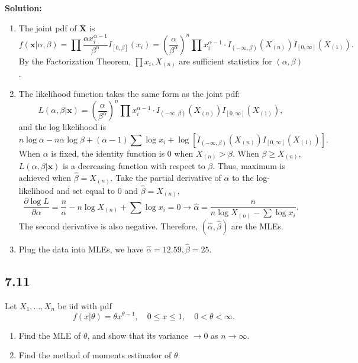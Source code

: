 \documentclass[11pt]{article}
\newcommand{\X}{\mathbf{X}}
\newcommand{\x}{\mathbf{x}}
\newcommand{\Sol}{\par {\bf Solution:}}
\newcommand{\sample}[1]{#1_1 , \dots , #1_n}
\begin{document}
\Sol
\begin{enumerate}[label=(\alph*)]
    \item
    The joint pdf of $\X$ is
    \[
    f(\x|\alpha, \beta) = \prod \frac{\alpha x_i^{\alpha - 1}}{\beta^\alpha} I_{[0,\beta]}(x_i) = (\frac{\alpha}{\beta^\alpha})^n \prod x_i^{\alpha-1} \cdot I_{(-\infty, \beta)}(X_{(n)})I_{[0, \infty]}(X_{(1)}).
    \]
    By the Factorization Theorem, $\prod x_i, X_{(n)}$ are sufficient statistics for $(\alpha , \beta)$.
    
    \item
    The likelihood function takes the same form as the joint pdf:
    \[
    L(\alpha, \beta|\x) = (\frac{\alpha}{\beta^\alpha})^n \prod x_i^{\alpha-1} \cdot I_{(-\infty, \beta)}(X_{(n)})I_{[0, \infty]}(X_{(1)}),
    \]
    and the log likelihood is 
    \[
    n\log \alpha - n\alpha \log \beta + (\alpha - 1)\sum \log x_i + \log [I_{(-\infty, \beta)}(X_{(n)})I_{[0, \infty]}(X_{(1)})].
    \]
    When $\alpha$ is fixed, the identity function is 0 when $X_{(n)} > \beta$. When $\beta \ge X_{(n)}$, $L(\alpha, \beta|\x)$ is a decreasing function with respect to $\beta$. Thus, maximum is achieved when $\hat \beta = X_{(n)}$.
    Take the partial derivative of $\alpha$ to the log-likelihood and set equal to 0 and $\hat \beta = X_{(n)}$, 
    \[
    \frac{\partial \log L}{\partial \alpha} = \frac{n}{\alpha} - n\log X_{(n)} + \sum \log x_i = 0 \to \hat \alpha = \frac{n}{n\log X_{(n)} - \sum \log x_i}.
    \]
    The second derivative is also negative.
    Therefore, $(\hat \alpha, \hat{\beta})$ are the MLEs.
    \item
    Plug the data into MLEs, we have $\hat \alpha = 12.59, \hat{\beta} = 25$.
\end{enumerate}


\subsection*{7.11}
Let $\sample{X}$ be iid with pdf
\[
f(x|\theta) = \theta x ^{\theta - 1}, \quad 0 \le x \le 1, \quad 0 < \theta < \infty.
\]
\begin{enumerate}[label=(\alph*)]
    \item Find the MLE of $\theta$, and show that its variance $\to 0$ as $n \to \infty$.
    \item Find the method of moments estimator of $\theta$.
\end{enumerate}
\end{document}
